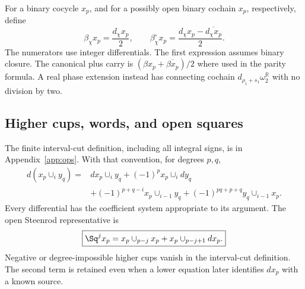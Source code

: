 For a binary cocycle $x_p$, and for a possibly open binary cochain $x_p$, respectively, define
\begin{equation}\label{eq:bocksteins}
 \beta_\chi x_p=\frac{d_\chi x_p}{2},\qquad
 \beta_\chi^\circ x_p=\frac{d_\chi x_p-\overline{d_\chi x_p}}{2}.
\end{equation}
The numerators use integer differentials. The first expression assumes binary closure. The canonical plus carry is $(\beta x_p+\overline{\beta x_p})/2$ where used in the parity formula. A real phase extension instead has connecting cochain $d_{\rho_1+s_1}\omega_2^{\mathbb R}$ with no division by two.

\subsection{Higher cups, words, and open squares}
The finite interval-cut definition, including all integral signs, is in Appendix~\ref{app:ops}. With that convention, for degrees $p,q$,
\begin{align}\label{eq:cup-id}
 d(x_p\cup_i y_q)={}&dx_p\cup_i y_q+(-1)^p x_p\cup_i dy_q\nonumber\\
 &+(-1)^{p+q-i}x_p\cup_{i-1}y_q
 +(-1)^{pq+p+q}y_q\cup_{i-1}x_p.
\end{align}
Every differential has the coefficient system appropriate to its argument. The open Steenrod representative is
\begin{equation}\label{eq:open-square}
 \boxed{\Sq^{j}x_p=x_p\cup_{p-j}x_p+x_p\cup_{p-j+1}dx_p.}
\end{equation}
Negative or degree-impossible higher cups vanish in the interval-cut definition. The second term is retained even when a lower equation later identifies $dx_p$ with a known source.

